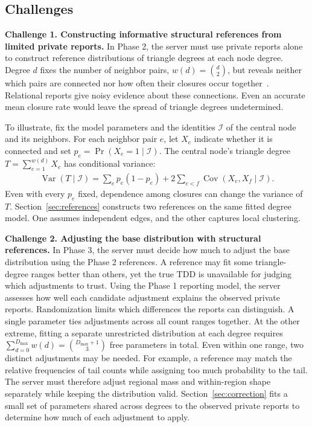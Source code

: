 \subsection{Challenges}
\label{sec:method_challenges}
\label{subsec:idea-challenges}
\noindent\textbf{Challenge 1. Constructing informative structural references from limited private reports.}
In Phase 2, the server must use private reports alone to construct reference distributions of triangle degrees at each node degree.
Degree $d$ fixes the number of neighbor pairs, $w(d)=\binom d2$, but reveals neither which pairs are connected nor how often their closures occur together~\cite{newman2009clustering}.
Relational reports give noisy evidence about these connections.
Even an accurate mean closure rate would leave the spread of triangle degrees undetermined.

To illustrate, fix the model parameters and the identities $\mathcal I$ of the central node and its neighbors.
For each neighbor pair $e$, let $X_e$ indicate whether it is connected and set $p_e=\Pr(X_e=1\mid\mathcal I)$.
The central node's triangle degree $T=\sum_{e=1}^{w(d)}X_e$ has conditional variance:
\begin{equation}
\begin{aligned}
\operatorname{Var}(T\mid\mathcal I)
=\sum_e p_e(1-p_e)+2\sum_{e<f}\operatorname{Cov}(X_e,X_f\mid\mathcal I).
\end{aligned}
\label{eq:challenge_closure_dependence}
\end{equation}
Even with every $p_e$ fixed, dependence among closures can change the variance of $T$.
Section~\ref{sec:references} constructs two references on the same fitted degree model. One assumes independent edges, and the other captures local clustering.

\noindent\textbf{Challenge 2. Adjusting the base distribution with structural references.}
In Phase 3, the server must decide how much to adjust the base distribution using the Phase 2 references.
A reference may fit some triangle-degree ranges better than others, yet the true TDD is unavailable for judging which adjustments to trust.
Using the Phase 1 reporting model, the server assesses how well each candidate adjustment explains the observed private reports.
Randomization limits which differences the reports can distinguish.
A single parameter ties adjustments across all count ranges together.
At the other extreme, fitting a separate unrestricted distribution at each degree requires $\sum_{d=0}^{D_{\max}}w(d)=\binom{D_{\max}+1}{3}$ free parameters in total.
Even within one range, two distinct adjustments may be needed.
For example, a reference may match the relative frequencies of tail counts while assigning too much probability to the tail.
The server must therefore adjust regional mass and within-region shape separately while keeping the distribution valid.
Section~\ref{sec:correction} fits a small set of parameters shared across degrees to the observed private reports to determine how much of each adjustment to apply.

